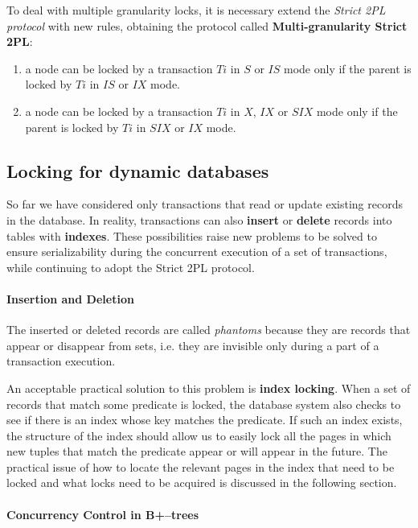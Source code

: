 To deal with multiple granularity locks, it is necessary extend the \textit{Strict 2PL protocol} with new rules, obtaining the protocol called \textbf{Multi-granularity Strict 2PL}:

\begin{enumerate}

    \item a node can be locked by a transaction $Ti$ in $S$ or $IS$ mode only if the parent is locked by $Ti$ in $IS$ or $IX$ mode.
    
    \item a node can be locked by a transaction $Ti$ in $X$, $IX$ or $SIX$ mode only if the parent is locked by $Ti$ in $SIX$ or $IX$ mode.

\end{enumerate}

\subsection{Locking for dynamic databases}

So far we have considered only transactions that read or update existing records in the database. In reality, transactions can also \textbf{insert} or \textbf{delete} records into tables with \textbf{indexes}. These possibilities raise new problems to be solved to ensure serializability during the concurrent execution of a set of transactions, while continuing to adopt the Strict 2PL protocol.

\paragraph{Insertion and Deletion}
The inserted or deleted records are called \textit{phantoms} because they are records that appear or disappear from sets, i.e. they are invisible only during a part of a transaction execution. 

An acceptable practical solution to this problem is \textbf{index locking}. When a set of records that match some predicate is locked, the database system also checks to see if there is an index whose key matches the predicate. If such an index exists, the structure of the index should allow us to easily lock all the pages in which new tuples that match the predicate appear or will appear in the future. The practical issue of how to locate the relevant pages in the index that need to be locked and what locks need to be acquired is discussed in the following section.

\paragraph{Concurrency Control in B+–trees}

